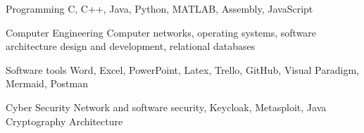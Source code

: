 

\begin{cvskills}

  \cvskill
    {Programming} %
    {C, C++, Java, Python, MATLAB, Assembly, JavaScript} %

  \cvskill
    {Computer Engineering}
    {Computer networks, operating systems, software architecture design and development, relational databases}

  \cvskill
    {Software tools}
    {Word, Excel, PowerPoint, Latex, Trello, GitHub, Visual Paradigm, Mermaid, Postman}

  \cvskill
    {Cyber Security}
    {Network and software security, Keycloak, Metasploit, Java Cryptography Architecture}

\end{cvskills}
